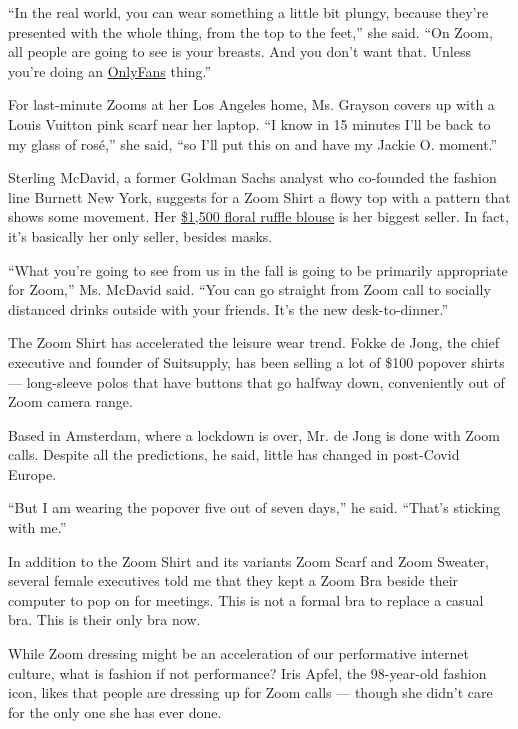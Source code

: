 ``In the real world, you can wear something a little bit plungy, because
they're presented with the whole thing, from the top to the feet,'' she
said. ``On Zoom, all people are going to see is your breasts. And you
don't want that. Unless you're doing an
\href{https://www.nytimes3xbfgragh.onion/2019/02/09/style/onlyfans-porn-stars.html}{OnlyFans}
thing.''

For last-minute Zooms at her Los Angeles home, Ms. Grayson covers up
with a Louis Vuitton pink scarf near her laptop. ``I know in 15 minutes
I'll be back to my glass of rosé,'' she said, ``so I'll put this on and
have my Jackie O. moment.''

Sterling McDavid, a former Goldman Sachs analyst who co-founded the
fashion line Burnett New York, suggests for a Zoom Shirt a flowy top
with a pattern that shows some movement. Her
\href{https://burnettnewyork.com/collections/new-arrivals/products/copy-of-embroidered-long-sleeve-mini-dress-1}{\$1,500
floral ruffle blouse} is her biggest seller. In fact, it's basically her
only seller, besides masks.

``What you're going to see from us in the fall is going to be primarily
appropriate for Zoom,'' Ms. McDavid said. ``You can go straight from
Zoom call to socially distanced drinks outside with your friends. It's
the new desk-to-dinner.''

The Zoom Shirt has accelerated the leisure wear trend. Fokke de Jong,
the chief executive and founder of Suitsupply, has been selling a lot of
\$100 popover shirts --- long-sleeve polos that have buttons that go
halfway down, conveniently out of Zoom camera range.

Based in Amsterdam, where a lockdown is over, Mr. de Jong is done with
Zoom calls. Despite all the predictions, he said, little has changed in
post-Covid Europe.

``But I am wearing the popover five out of seven days,'' he said.
``That's sticking with me.''

In addition to the Zoom Shirt and its variants Zoom Scarf and Zoom
Sweater, several female executives told me that they kept a Zoom Bra
beside their computer to pop on for meetings. This is not a formal bra
to replace a casual bra. This is their only bra now.

While Zoom dressing might be an acceleration of our performative
internet culture, what is fashion if not performance? Iris Apfel, the
98-year-old fashion icon, likes that people are dressing up for Zoom
calls --- though she didn't care for the only one she has ever done.


